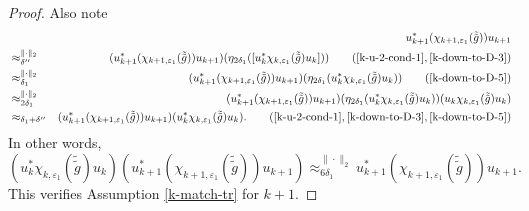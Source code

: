 \documentclass[12pt, oneside, psamsfonts]{amsart}
\theoremstyle{definition}
\theoremstyle{remark}
\numberwithin{equation}{section}
\newcommand{\norm}[1]{\| #1\|}
\newcommand{\eps}{\varepsilon}
\begin{document}
\begin{proof}
 Also note 
 \begin{eqnarray*}
 & & u_{k+1}^*( \chi_{k+1, \eps_1}(\tilde{\tilde{g}})) u_{k+1} \\
 & \approx_{\delta''}^{\norm{\cdot}_2} & (u_{k+1}^*( \chi_{k+1, \eps_1}(\tilde{\tilde{g}})) u_{k+1}) ( \eta_{2\delta_1}([u_k^* \chi_{k, \eps_1}(\tilde{\tilde{g}}) u_k] )) \quad \quad (\eqref{k-u-2-cond-1}, \eqref{k-down-to-D-3}) \\
 & \approx_{\delta_1}^{\norm{\cdot}_2} & (u_{k+1}^*( \chi_{k+1, \eps_1}(\tilde{\tilde{g}})) u_{k+1}) ( \eta_{2\delta_1}(u_k^* \chi_{k, \eps_1}(\tilde{\tilde{g}}) u_k )) \quad \quad (\eqref{k-down-to-D-5}) \\
 & \approx_{2\delta_1}^{\norm{\cdot}_2} & (u_{k+1}^*( \chi_{k+1, \eps_1}(\tilde{\tilde{g}})) u_{k+1}) ( \eta_{2\delta_1}(u_k^* \chi_{k, \eps_1}(\tilde{\tilde{g}}) u_k )) (u_k\chi_{k, \eps_1}(\tilde{\tilde{g}}) u_k) \\
 &\approx_{\delta_1+\delta''}& (u_{k+1}^*( \chi_{k+1, \eps_1}(\tilde{\tilde{g}})) u_{k+1}) (u^*_k\chi_{k, \eps_1}(\tilde{\tilde{g}}) u_k). \quad \quad (\eqref{k-u-2-cond-1}, \eqref{k-down-to-D-3}, \eqref{k-down-to-D-5})
\end{eqnarray*}
In other words,
\begin{equation*}
 (u_k^* \chi_{k, \eps_1}(\tilde{\tilde{g}}) u_k)(u_{k+1}^*(\chi_{k+1, \eps_1}(\tilde{\tilde{g}}) )u_{k+1}) \approx_{6\delta_1}^{\norm{\cdot}_2} u_{k+1}^*(\chi_{k+1, \eps_1}(\tilde{\tilde{g}}) )u_{k+1}.
 \end{equation*}
 This verifies Assumption \eqref{k-match-tr} for $k+1$.
 

\end{proof}
\end{document}
